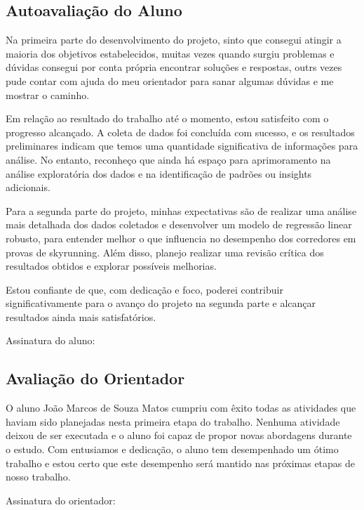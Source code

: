 \subsection{Autoavaliação do Aluno}

Na primeira parte do desenvolvimento do projeto, sinto que consegui atingir a maioria dos objetivos estabelecidos, muitas vezes quando surgiu problemas e dúvidas consegui por conta própria encontrar soluções e respostas, outrs vezes pude contar com ajuda do meu orientador para sanar algumas dúvidas e me mostrar o caminho. 

Em relação ao resultado do trabalho até o momento, estou satisfeito com o progresso alcançado. A coleta de dados foi concluída com sucesso, e os resultados preliminares indicam que temos uma quantidade significativa de informações para análise. No entanto, reconheço que ainda há espaço para aprimoramento na análise exploratória dos dados e na identificação de padrões ou insights adicionais.

Para a segunda parte do projeto, minhas expectativas são de realizar uma análise mais detalhada dos dados coletados e desenvolver um modelo de regressão linear robusto, para entender melhor o que influencia no desempenho dos corredores em provas de skyrunning. Além disso, planejo realizar uma revisão crítica dos resultados obtidos e explorar possíveis melhorias.

Estou confiante de que, com dedicação e foco, poderei contribuir significativamente para o avanço do projeto na segunda parte e alcançar resultados ainda mais satisfatórios.

\vspace{0.5cm} %

\begin{center}
Assinatura do aluno: \underline{\hspace{8cm}} %
\end{center}


\subsection{Avaliação do Orientador}

O aluno João Marcos de Souza Matos cumpriu com êxito todas as atividades que haviam sido planejadas nesta primeira etapa do trabalho. Nenhuma atividade deixou de ser executada e o aluno foi capaz de propor novas abordagens durante o estudo. Com entusiamos e dedicação, o aluno tem desempenhado um ótimo trabalho e estou certo que este desempenho será mantido nas próximas etapas de nosso trabalho.




\vspace{1cm} %
\begin{center}
Assinatura do orientador: \underline{\hspace{8cm}} %
\end{center}